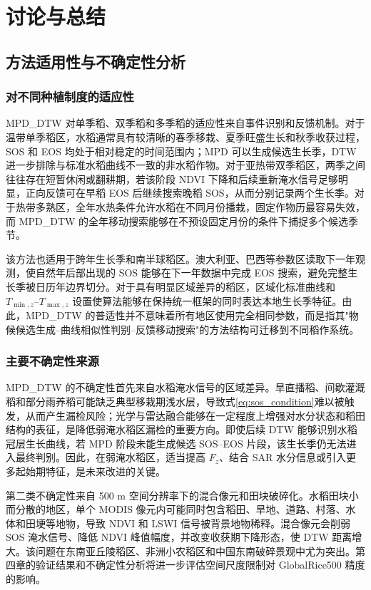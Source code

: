 \section{讨论与总结}

\subsection{方法适用性与不确定性分析}

\subsubsection{对不同种植制度的适应性}

MPD\_DTW 对单季稻、双季稻和多季稻的适应性来自事件识别和反馈机制。对于温带单季稻区，水稻通常具有较清晰的春季移栽、夏季旺盛生长和秋季收获过程，SOS 和 EOS 均处于相对稳定的时间范围内；MPD 可以生成候选生长季，DTW 进一步排除与标准水稻曲线不一致的非水稻作物。对于亚热带双季稻区，两季之间往往存在短暂休闲或翻耕期，若该阶段 NDVI 下降和后续重新淹水信号足够明显，正向反馈可在早稻 EOS 后继续搜索晚稻 SOS，从而分别记录两个生长季。对于热带多熟区，全年水热条件允许水稻在不同月份播栽，固定作物历最容易失效，而 MPD\_DTW 的全年移动搜索能够在不预设固定月份的条件下捕捉多个候选季节。

该方法也适用于跨年生长季和南半球稻区。澳大利亚、巴西等参数区读取下一年观测，使自然年后部出现的 SOS 能够在下一年数据中完成 EOS 搜索，避免完整生长季被日历年边界切分。对于具有明显区域差异的稻区，区域化标准曲线和 \(T_{\min,z}\)--\(T_{\max,z}\) 设置使算法能够在保持统一框架的同时表达本地生长季特征。由此，MPD\_DTW 的普适性并不意味着所有地区使用完全相同参数，而是指其"物候候选生成--曲线相似性判别--反馈移动搜索"的方法结构可迁移到不同稻作系统。

\subsubsection{主要不确定性来源}

MPD\_DTW 的不确定性首先来自水稻淹水信号的区域差异。旱直播稻、间歇灌溉稻和部分雨养稻可能缺乏典型移栽期浅水层，导致式\ref{eq:sos_condition}难以被触发，从而产生漏检风险；光学与雷达融合能够在一定程度上增强对水分状态和稻田结构的表征，是降低弱淹水稻区漏检的重要方向\cite{Zhao2024OpticalRadar}。即使后续 DTW 能够识别水稻冠层生长曲线，若 MPD 阶段未能生成候选 SOS--EOS 片段，该生长季仍无法进入最终判别。因此，在弱淹水稻区，适当提高 \(F_z\)、结合 SAR 水分信息或引入更多起始期特征，是未来改进的关键。

第二类不确定性来自 500 m 空间分辨率下的混合像元和田块破碎化。水稻田块小而分散的地区，单个 MODIS 像元内可能同时包含稻田、旱地、道路、村落、水体和田埂等地物，导致 NDVI 和 LSWI 信号被背景地物稀释。混合像元会削弱 SOS 淹水信号、降低 NDVI 峰值幅度，并改变收获期下降形态，使 DTW 距离增大。该问题在东南亚丘陵稻区、非洲小农稻区和中国东南破碎景观中尤为突出\cite{Onojeghuo2018,Dong2016}。第四章的验证结果和不确定性分析将进一步评估空间尺度限制对 GlobalRice500 精度的影响。

